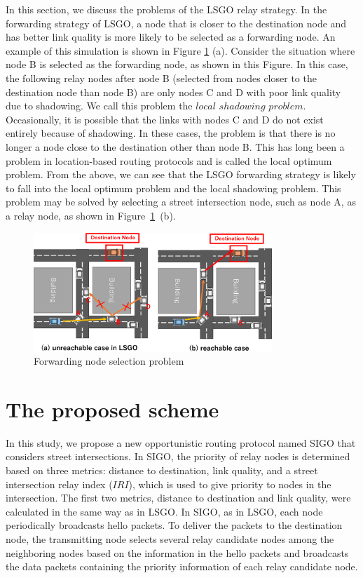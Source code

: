 \documentclass[conference]{IEEEtran}
\begin{document}
In this section, we discuss the problems of the LSGO relay strategy.  
In the forwarding strategy of LSGO, a node that is closer to the destination node and has better link quality is more likely to be selected as a forwarding node. 
An example of this simulation is shown in Figure \ref{fig:LSGO-route} (a). 
Consider the situation where node B is selected as the forwarding node, as shown in this Figure. 
In this case, the following relay nodes after node B (selected from nodes closer to the destination node than node B) are only nodes C and D with poor link quality due to shadowing.  
We call this problem the $local$ $shadowing$ $problem$. 
Occasionally, it is possible  that the links with nodes C and D do not exist entirely  because of  shadowing. 
In these cases, the problem is that there is no longer a node close to the destination other than  node B. 
This has long been a problem in  location-based routing protocols and is called the local optimum problem. 
From the above, we can see that the LSGO forwarding strategy is likely to fall into the local optimum problem and the local shadowing problem. This problem may be solved by selecting a street intersection node, such as node A, as a relay node, as shown in \mbox{Figure \ref{fig:LSGO-route} (b)}. 




\begin{figure}[!ht]
\centering
\includegraphics[width=90mm]{figures/efficient_route.eps}
\caption{Forwarding node selection problem}
\label{fig:LSGO-route}
\end{figure}



\section{The proposed scheme}
\label{SIGO}
In this study, we propose a new opportunistic routing protocol named SIGO that considers street intersections. 
In SIGO, the priority of relay nodes is determined based on three metrics: distance to destination, link quality, and a street intersection relay index ($IRI$), which is used to give priority to nodes in the intersection.
The first two metrics, distance to destination and link quality, were calculated in the same way as in LSGO. 
In SIGO, as in LSGO, each node periodically broadcasts hello packets. To deliver the packets to the destination node, the transmitting node selects several relay candidate nodes among the neighboring nodes based on the information in the hello packets and broadcasts the data packets containing the priority information of each relay candidate node.
\end{document}
